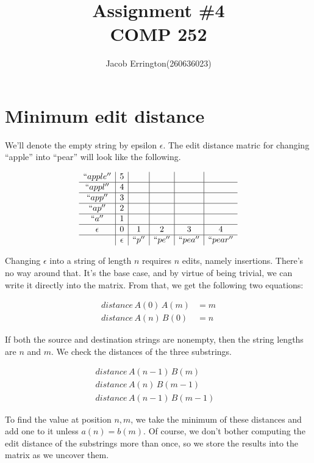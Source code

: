 \documentclass{article}
\author{Jacob Errington(260636023)}
\title{Assignment \#4\\COMP 252}
\begin{document}
\maketitle

\section{Minimum edit distance}

We'll denote the empty string by epsilon $\epsilon$. The edit distance matric for changing ``apple'' into ``pear'' will look like the following.

$$
    \begin{array}{c | c | c | c | c | c}
        ``apple'' & 5 & & & & \\
        \hline
        ``appl'' & 4 & & & & \\
        \hline
        ``app'' & 3 & & & & \\
        \hline
        ``ap'' & 2 & & & & \\
        \hline
        ``a'' & 1 & & & & \\
        \hline
        \epsilon & 0 & 1 & 2 & 3 & 4 \\
        \hline
                   & \epsilon & ``p'' & ``pe'' & ``pea'' & ``pear''
    \end{array}
$$

Changing $\epsilon$ into a string of length $n$ requires $n$ edits, namely insertions. There's no way around that. It's the base case, and by virtue of being trivial, we can write it directly into the matrix.
From that, we get the following two equations:

\begin{align*}
    distance\, A(0)\, A(m) &= m \\
    distance\, A(n)\, B(0) &= n
\end{align*}

If both the source and destination strings are nonempty, then the string lengths are $n$ and $m$. We check the distances of the three substrings.

\begin{align*}
    distance\, A(n-1)\, B(m) &\\
    distance\, A(n)\, B(m-1) &\\
    distance\, A(n-1)\, B(m-1) &
\end{align*}

To find the value at position $n,m$, we take the minimum of these distances and
add one to it unless $a(n) = b(m)$. Of course, we don't bother computing the
edit distance of the substrings more than once, so we store the results into
the matrix as we uncover them.
\end{document}
